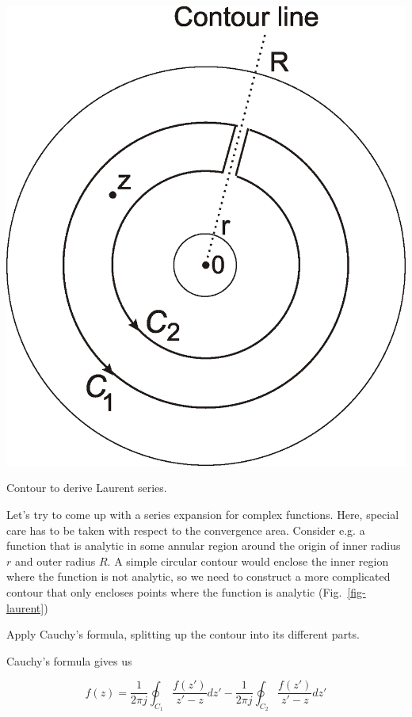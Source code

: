 \begin{marginfigure}
\includegraphics{complex/figures/laurent}
\caption{Contour to derive Laurent series.}
\label{fig-laurent}
\end{marginfigure}

Let's try to come up with a series expansion for complex functions. Here, special care has to be taken with respect to the convergence area. Consider e.g. a function that is analytic in some annular region around the origin of inner radius $r$ and outer radius $R$. A simple circular contour would enclose the inner region where the function is not analytic, so we need to construct a more complicated contour that only encloses points where the function is analytic (Fig.~\ref{fig-laurent})

\begin{cue}
  Apply Cauchy's formula, splitting up the contour into its different parts.
\end{cue}

Cauchy's formula gives us

\begin{equation}
f(z)=\frac{1}{2 \pi j }\oint_{{C}_1} \frac{f(z')} {z'-z} dz' -\frac{1}{2
\pi j }\oint_{{C}_2} \frac{f(z')} {z'-z} dz' \label{laurent_0}
\end{equation} 

